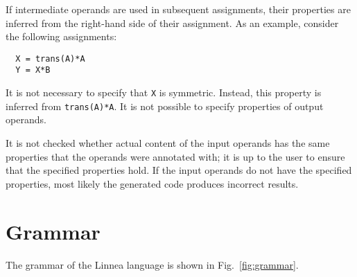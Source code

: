 \documentclass[
  12pt,
  a4paper,
]{scrartcl}
\begin{document}
If intermediate operands are used in subsequent assignments, their properties are inferred from the right-hand side of their assignment. As an example, consider the following assignments:
\begin{verbatim}
  X = trans(A)*A
  Y = X*B
\end{verbatim}
It is not necessary to specify that \texttt{X} is symmetric. Instead, this property is inferred from \texttt{trans(A)*A}. It is not possible to specify properties of output operands.

It is not checked whether actual content of the input operands has the same properties that the operands were annotated with; it is up to the user to ensure that the specified properties hold. If the input operands do not have the specified properties, most likely the generated code produces incorrect results.

\section{Grammar}

The grammar of the Linnea language is shown in Fig.~\ref{fig:grammar}.

\newcommand{\nt}[1]{\textit{#1}}
\newcommand{\te}[1]{\texttt{#1}}

\renewcommand{\arraystretch}{1.1}
\end{document}
